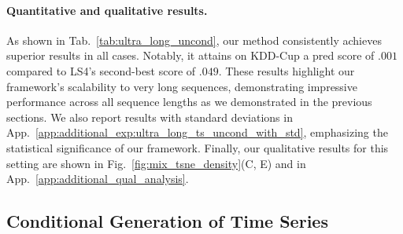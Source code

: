 \documentclass{article}
\begin{document}
\begin{table}
    \centering
    \caption{Ultra-long unconditional generation.}
    \label{tab:ultra_long_uncond}
    \setlength{\tabcolsep}{1pt}
\end{table}


\paragraph{Quantitative and qualitative results.} 

As shown in Tab.~\ref{tab:ultra_long_uncond}, our method consistently achieves superior results in all cases. Notably, it attains on KDD-Cup a pred score of $.001$ compared to LS4's second-best score of $.049$. These results highlight our framework's scalability to very long sequences, demonstrating impressive performance across all sequence lengths as we demonstrated in the previous sections. We also report results with standard deviations in App.~\ref{app:additional_exp:ultra_long_ts_uncond_with_std}, emphasizing the statistical significance of our framework. Finally, our qualitative results for this setting are shown in Fig.~\ref{fig:mix_tsne_density}(C, E) and in App.~\ref{app:additional_qual_analysis}.


\subsection{Conditional Generation of Time Series}
\label{sec:experiments:conditional_generation}
\end{document}
